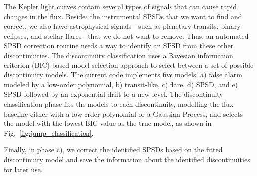 \documentclass[useAMS,usenatbib]{mn2e}
\begin{document}
The Kepler light curves contain several types of signals that can cause rapid
changes in the flux. Besides the instrumental SPSDs that we want to find and correct, 
we also have astrophysical signals---such as planetary transits, binary eclipses, and stellar 
flares---that we do not want to remove. Thus, an automated SPSD correction routine
needs a way to identify an SPSD from these other discontinuities. The discontinuity classification uses a 
Bayesian information criterion (BIC)-based model selection approach to select between a set of possible discontinuity models. The current code implements five models: a) false alarm modeled by a low-order polynomial, b) transit-like, c) flare, d) SPSD, and e) SPSD followed by an exponential drift to a new level. The discontinuity classification phase fits the models to each discontinuity, modelling the flux baseline either with a low-order polynomial or a
Gaussian Process, and selects the model with the lowest BIC value as the true model, as shown in Fig.~\ref{fig:jump_classification}.

Finally, in phase c), we correct the identified SPSDs based on the fitted discontinuity model and
save the information about the identified discontinuities for later use. 
\end{document}
